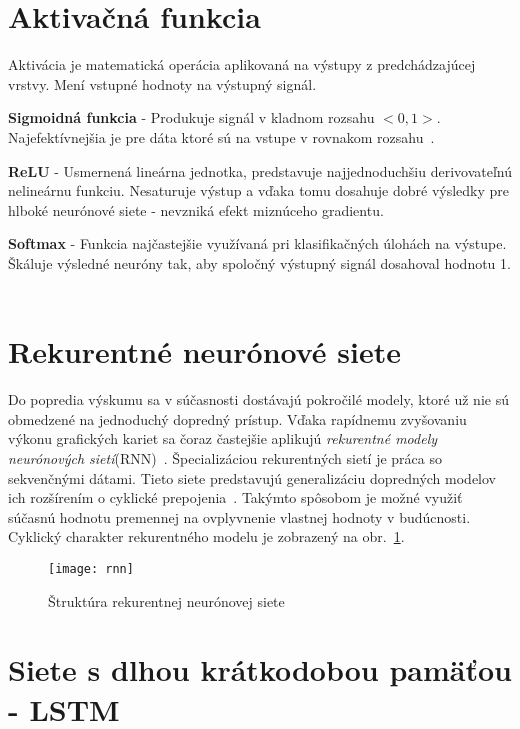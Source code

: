 \section{Aktivačná funkcia}
\label{activation_function}

Aktivácia je matematická operácia aplikovaná na výstupy z predchádzajúcej vrstvy. Mení vstupné hodnoty na výstupný signál. 

\textbf{Sigmoidná funkcia} - Produkuje signál v kladnom rozsahu $<0,1>$. Najefektívnejšia je pre dáta ktoré sú na vstupe v rovnakom rozsahu~\cite{sibi2013analysis}.

\textbf{ReLU} - Usmernená lineárna jednotka, predstavuje najjednoduchšiu derivovateľnú nelineárnu funkciu. Nesaturuje výstup a vďaka tomu dosahuje dobré výsledky pre hlboké neurónové siete - nevzniká efekt miznúceho gradientu.
	
\textbf{Softmax} - Funkcia najčastejšie využívaná pri klasifikačných úlohách na výstupe. Škáluje výsledné neuróny tak, aby spoločný výstupný signál dosahoval hodnotu 1. ~\cite{toth2013phone}


\section{Rekurentné neurónové siete}
\label{analyza_pokrocile_modely_nn}

Do popredia výskumu sa v súčasnosti dostávajú pokročilé modely, ktoré už nie sú obmedzené na jednoduchý dopredný prístup. Vďaka rapídnemu zvyšovaniu výkonu grafických kariet sa čoraz častejšie aplikujú \textit{rekurentné modely neurónových sietí}(RNN)~\cite{jaeger2002tutorial}. Špecializáciou rekurentných sietí je práca so sekvenčnými dátami. Tieto siete predstavujú generalizáciu dopredných modelov ich rozšírením o cyklické prepojenia~\cite{Goodfellow-et-al-2016-Book}.
Takýmto spôsobom je možné využiť súčasnú hodnotu premennej na ovplyvnenie vlastnej hodnoty v budúcnosti. Cyklický charakter rekurentného modelu je zobrazený na obr.~\ref{fig:rnn}.

\begin{figure}[H]
\begin{center}\texttt{[image: rnn]}\end{center}
\caption[rnn]{Štruktúra rekurentnej neurónovej siete~\cite{jaeger2002tutorial}}\label{fig:rnn}
\end{figure}

\section{Siete s dlhou krátkodobou pamäťou - LSTM}


